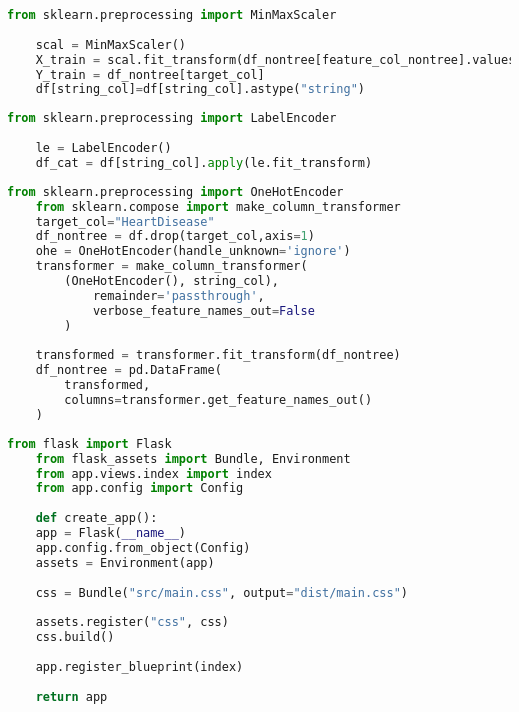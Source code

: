 \begin{lstlisting}[language=Python, caption={Scaling with MinMaxScaler}, label={lst:min-max-scaler}]
	from sklearn.preprocessing import MinMaxScaler
	
	scal = MinMaxScaler()
	X_train = scal.fit_transform(df_nontree[feature_col_nontree].values)
	Y_train = df_nontree[target_col]
	df[string_col]=df[string_col].astype("string")
\end{lstlisting}

\begin{lstlisting}[language=Python, caption={Applying Label Encoder to the dataframe}, label={lst:label-encoding}]
	from sklearn.preprocessing import LabelEncoder
	
	le = LabelEncoder()
	df_cat = df[string_col].apply(le.fit_transform)
\end{lstlisting}
\begin{lstlisting}[language=Python, caption={Applying One-Hot Encoder to the dataframe}, label={lst:one-hot-encoding}]
	from sklearn.preprocessing import OneHotEncoder
	from sklearn.compose import make_column_transformer
	target_col="HeartDisease"
	df_nontree = df.drop(target_col,axis=1)	
	ohe = OneHotEncoder(handle_unknown='ignore')
	transformer = make_column_transformer(
		(OneHotEncoder(), string_col),
			remainder='passthrough',
			verbose_feature_names_out=False
		)
		
	transformed = transformer.fit_transform(df_nontree)
	df_nontree = pd.DataFrame(
		transformed, 
		columns=transformer.get_feature_names_out()
	)
\end{lstlisting}

\begin{lstlisting}[language=Python, caption={App Entrypoint}, label={lst:web-server-entrypoint}]
	from flask import Flask
	from flask_assets import Bundle, Environment
	from app.views.index import index
	from app.config import Config
	
	def create_app():
	app = Flask(__name__)
	app.config.from_object(Config)
	assets = Environment(app)
	
	css = Bundle("src/main.css", output="dist/main.css")
	
	assets.register("css", css)
	css.build()
	
	app.register_blueprint(index)
	
	return app
\end{lstlisting}

